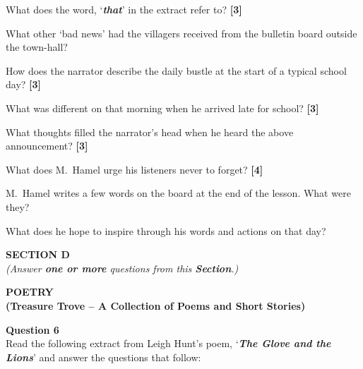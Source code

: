 \documentclass[12pt,a4paper]{article}
\newcommand{\qmarks}[1]{\hfill\textbf{[#1]}}
\begin{document}
\begin{romanenum}
    \item What does the word, `\textbf{\textit{that}}' in the extract refer to? \qmarks{3}

    What other `bad news' had the villagers received from the bulletin board outside the town-hall?

    \item How does the narrator describe the daily bustle at the start of a typical school day? \qmarks{3}

    \item What was different on that morning when he arrived late for school? \qmarks{3}

    \item What thoughts filled the narrator's head when he heard the above announcement? \qmarks{3}

    \item What does M.\ Hamel urge his listeners never to forget? \qmarks{4}

    M.\ Hamel writes a few words on the board at the end of the lesson. What were they?

    What does he hope to inspire through his words and actions on that day?
\end{romanenum}

\newpage

\begin{center}
    {\large\bfseries SECTION D}\\[2pt]
    \textit{(Answer \textbf{one or more} questions from this \textbf{Section}.)}
\end{center}

\vspace{4pt}
\begin{center}
    {\large\bfseries POETRY}\\[2pt]
    \textbf{(Treasure Trove -- A Collection of Poems and Short Stories)}
\end{center}

\vspace{6pt}

\textbf{Question 6}\\
Read the following extract from Leigh Hunt's poem, `\textbf{\textit{The Glove and the Lions}}' and answer the questions that follow:
\end{document}
